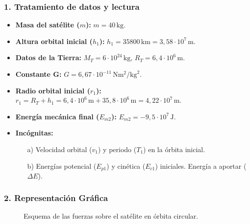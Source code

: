 \subsubsection*{1. Tratamiento de datos y lectura}
\begin{itemize}
    \item \textbf{Masa del satélite ($m$):} $m = 40 \, \text{kg}$.
    \item \textbf{Altura orbital inicial ($h_1$):} $h_1 = 35800 \, \text{km} = 3,58 \cdot 10^7 \, \text{m}$.
    \item \textbf{Datos de la Tierra:} $M_T = 6 \cdot 10^{24} \, \text{kg}$, $R_T = 6,4 \cdot 10^6 \, \text{m}$.
    \item \textbf{Constante G:} $G = 6,67 \cdot 10^{-11} \, \text{N}\text{m}^2/\text{kg}^2$.
    \item \textbf{Radio orbital inicial ($r_1$):} $r_1 = R_T + h_1 = 6,4 \cdot 10^6 \, \text{m} + 35,8 \cdot 10^6 \, \text{m} = 4,22 \cdot 10^7 \, \text{m}$.
    \item \textbf{Energía mecánica final ($E_{m2}$):} $E_{m2} = -9,5 \cdot 10^7 \, \text{J}$.
    \item \textbf{Incógnitas:}
    \begin{itemize}
        \item[a)] Velocidad orbital ($v_1$) y periodo ($T_1$) en la órbita inicial.
        \item[b)] Energías potencial ($E_{p1}$) y cinética ($E_{c1}$) iniciales. Energía a aportar ($\Delta E$).
    \end{itemize}
\end{itemize}

\subsubsection*{2. Representación Gráfica}
\begin{figure}[H]
    \centering
    \caption{Esquema de las fuerzas sobre el satélite en órbita circular.}
\end{figure}

